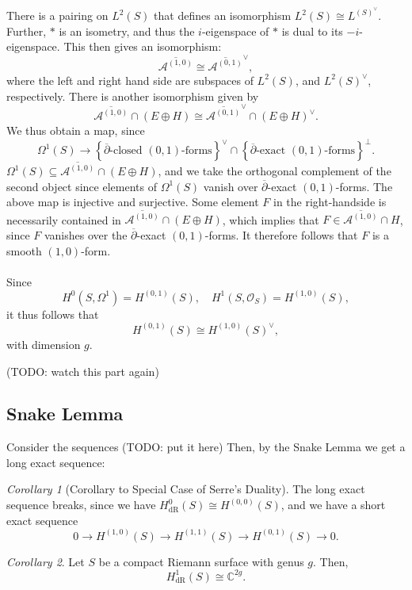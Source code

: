 \documentclass[a4paper]{report}
\theoremstyle{definition}
\theoremstyle{remark}
\theoremstyle{proposition}
\theoremstyle{conjecture}
\theoremstyle{lemma}
\theoremstyle{corollary}
\newtheorem{corollary}{Corollary}
\theoremstyle{exercise}
\theoremstyle{example}
\newcommand{\C}{\mathbb{C}}
\newcommand{\mcal}{\mathcal}
\newcommand{\on}{\operatorname}
\begin{document}
There is a pairing on $L^2(S)$ that defines an isomorphism 
$L^2(S) \cong L^(S)^\vee$. Further, $\ast$ is an isometry, and thus 
the $i$-eigenspace of $\ast$ is dual to its $-i$-eigenspace. 
This then gives an isomorphism:
$$\overline{\mcal{A}^{(1,0)}} \cong \overline{\mcal{A}^{(0,1)}}^\vee,$$
where the left and right hand side are subspaces of 
$L^2(S)$, and $L^2(S)^\vee$, respectively. 
There is another isomorphism given by 
$$\overline{\mcal{A}^{(1,0)}}\cap (E\oplus H) \cong \overline{\mcal{A}^{(0,1)}}^\vee \cap (E\oplus H)^\vee.$$
We thus obtain a map, since 
$$\Omega^1(S) \longrightarrow \left\lbrace \text{$\overline{\partial}$-closed 
$(0,1)$-forms}\right\rbrace^\vee\cap \left\lbrace \text{$\overline{\partial}$-exact $(0,1)$-forms}\right\rbrace^\perp.$$
$\Omega^1(S) \subseteq \overline{\mcal{A}^{(1,0)}}\cap (E\oplus H)$, and we 
take the orthogonal complement of the second object since elements of 
$\Omega^1(S)$ vanish over $\overline{\partial}$-exact $(0,1)$-forms.
The above map is injective and surjective. Some element $F$ in the 
right-handside is necessarily contained in 
$\overline{\mcal{A}^{(1,0)}}\cap (E\oplus H)$, which implies that 
$F \in \overline{\mcal{A}^{(1,0)}} \cap H$, since $F$ vanishes over the 
$\overline{\partial}$-exact $(0,1)$-forms.
It therefore follows that $F$ is a smooth $(1,0)$-form. \\\\
Since 
$$H^0(S,\Omega^1) = H^{(0,1)}(S), \quad H^1(S,\mcal{O}_S) = H^{(1,0)}(S),$$
it thus follows that 
$$H^{(0,1)}(S) \cong H^{(1,0)}(S)^\vee,$$ with dimension $g$. 

(TODO: watch this part again)

\subsection{Snake Lemma}

Consider the sequences (TODO: put it here)
Then, by the Snake Lemma we get a long exact sequence: 

\begin{corollary}[Corollary to Special Case of Serre's Duality]
    The long exact sequence breaks, since 
    we have $H^0_{\on{dR}}(S) \cong H^{(0,0)}(S)$,
    and we have a short exact sequence
    $$0\to H^{(1,0)}(S) \to H^{(1,1)}(S) \to H^{(0,1)}(S) \to 0.$$
\end{corollary}

\begin{corollary}
    Let $S$ be a compact Riemann surface with 
    genus $g$. Then, $$H^1_{\on{dR}}(S) \cong \C^{2g}.$$
\end{corollary}
\end{document}
